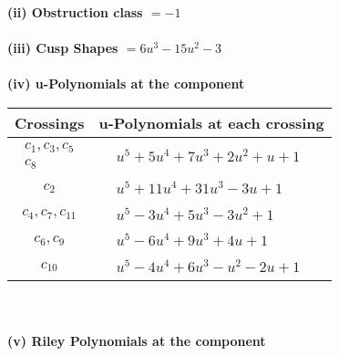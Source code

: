 \documentclass[1p]{elsarticle_modified}
\theoremstyle{definition}
\begin{document}
\flushleft \textbf{(ii) Obstruction class $= -1$}\\~\\
\flushleft \textbf{(iii) Cusp Shapes $= 6 u^3-15 u^2-3$}\\~\\
\newpage\renewcommand{\arraystretch}{1}
\flushleft \textbf{(iv) u-Polynomials at the component}\newline \\
\begin{tabular}{m{50pt}|m{274pt}}
Crossings & \hspace{64pt}u-Polynomials at each crossing \\
\hline $$\begin{aligned}c_{1},c_{3},c_{5}\\c_{8}\end{aligned}$$&$\begin{aligned}
&u^5+5 u^4+7 u^3+2 u^2+u+1
\end{aligned}$\\
\hline $$\begin{aligned}c_{2}\end{aligned}$$&$\begin{aligned}
&u^5+11 u^4+31 u^3-3 u+1
\end{aligned}$\\
\hline $$\begin{aligned}c_{4},c_{7},c_{11}\end{aligned}$$&$\begin{aligned}
&u^5-3 u^4+5 u^3-3 u^2+1
\end{aligned}$\\
\hline $$\begin{aligned}c_{6},c_{9}\end{aligned}$$&$\begin{aligned}
&u^5-6 u^4+9 u^3+4 u+1
\end{aligned}$\\
\hline $$\begin{aligned}c_{10}\end{aligned}$$&$\begin{aligned}
&u^5-4 u^4+6 u^3- u^2-2 u+1
\end{aligned}$\\
\hline
\end{tabular}\\~\\
\newpage\renewcommand{\arraystretch}{1}
\flushleft \textbf{(v) Riley Polynomials at the component}\newline \\
\end{document}
